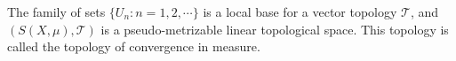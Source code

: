 The family of sets $\{ U_n : n = 1, 2, \cdots \}$ is a local base for a vector topology $\mathcal{T}$, and $(S(X, \mu), \mathcal{T})$ is a pseudo-metrizable linear topological space. This topology is called the topology of convergence in measure.
